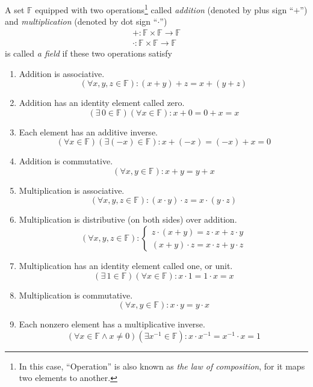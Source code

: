 \begin{definition}[Field]
	A set $\mathbb{F}$ equipped with two operations\footnote{In this case, ``Operation'' is also known as \textit{the law of composition}, for it maps two elements to another.} called \textit{addition} (denoted by plus sign ``$+$'') and \textit{multiplication} (denoted by dot sign ``$\cdot$'')
	\[
		\begin{split}
			+: \mathbb{F}\times\mathbb{F}\to\mathbb{F} \\
			\cdot: \mathbb{F}\times\mathbb{F}\to\mathbb{F}
		\end{split}
	\]
	is called \textit{a field} if these two operations satisfy
	\begin{enumerate}[label = (\arabic*)]
		\item Addition is associative.
		      \[
			      (\forall x, y, z\in\mathbb{F}): (x + y) + z = x + (y + z)
		      \]
		\item Addition has an identity element called zero.
		      \[
			      (\exists\,0\in\mathbb{F})(\forall x\in\mathbb{F}): x + 0 = 0 + x = x
		      \]
		\item Each element has an additive inverse.
		      \[
			      (\forall x\in\mathbb{F})(\exists (-x)\in\mathbb{F}): x + (-x) = (-x) + x = 0
		      \]
		\item Addition is commutative.
		      \[
			      (\forall x,y\in\mathbb{F}): x + y = y + x
		      \]
		\item Multiplication is associative.
		      \[
			      (\forall x, y, z\in\mathbb{F}): (x\cdot y)\cdot z = x\cdot (y\cdot z)
		      \]
		\item Multiplication is distributive (on both sides) over addition.
		      \[
			      (\forall x, y, z\in\mathbb{F}):
			      \begin{cases}
				      z\cdot (x + y) = z\cdot x + z\cdot y \\
				      (x + y)\cdot z = x\cdot z + y\cdot z
			      \end{cases}
		      \]
        \item Multiplication has an identity element called one, or unit.
		      \[
			      (\exists\,1\in\mathbb{F})(\forall x\in\mathbb{F}): x\cdot 1 = 1\cdot x = x
		      \]
		\item Multiplication is commutative.
		      \[
			      (\forall x, y\in\mathbb{F}): x\cdot y = y\cdot x
		      \]
		\item Each nonzero element has a multiplicative inverse.
		      \[
			      (\forall x\in\mathbb{F} \wedge x\ne 0)(\exists x^{-1}\in\mathbb{F}): x\cdot x^{-1} = x^{-1}\cdot x = 1
		      \]
	\end{enumerate}
\end{definition}

